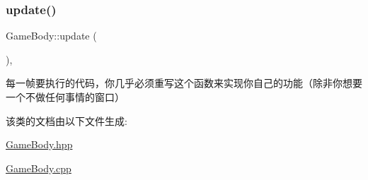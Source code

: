\subsubsection{\texorpdfstring{update()}{update()}}
{\footnotesize\ttfamily Game\+Body\+::update (\begin{DoxyParamCaption}{ }\end{DoxyParamCaption})\hspace{0.3cm}{\ttfamily [inline]}, {\ttfamily [virtual]}}



每一帧要执行的代码，你几乎必须重写这个函数来实现你自己的功能（除非你想要一个不做任何事情的窗口） 



该类的文档由以下文件生成\+:\begin{DoxyCompactItemize}
\item 
\mbox{\hyperlink{_game_body_8hpp}{Game\+Body.\+hpp}}\item 
\mbox{\hyperlink{_game_body_8cpp}{Game\+Body.\+cpp}}\end{DoxyCompactItemize}

